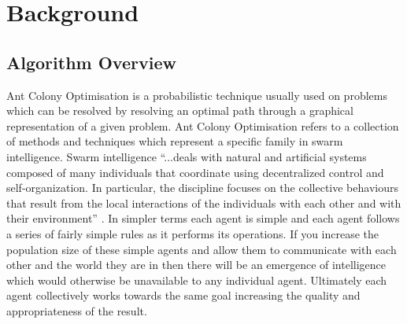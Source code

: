 \chapter{Background}
\label{chapt:bg}
\section{Algorithm Overview}
\label{agloover}
Ant Colony Optimisation is a probabilistic technique usually used on problems which can be resolved by resolving an optimal path through a graphical representation of a given problem. Ant Colony Optimisation refers to a collection of methods and techniques which represent a specific family in swarm intelligence. Swarm intelligence \enquote{...deals with natural and artificial systems composed of many individuals that coordinate using decentralized control and self-organization. In particular, the discipline focuses on the collective behaviours that result from the local interactions of the individuals with each other and with their environment} \cite{SI:def}. In simpler terms each agent is simple and each agent follows a series of fairly simple rules as it performs its operations. If you increase the population size of these simple agents and allow them to communicate with each other and the world they are in then there will be an emergence of intelligence which would otherwise be unavailable to any individual agent. Ultimately each agent collectively works towards the same goal increasing the quality and appropriateness of the result.

